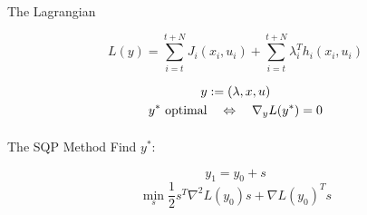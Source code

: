 

\begin{frame}{The Lagrangian}
\begin{block}{ }
\[  L(y) =   \sum\limits_{i=t}^{t+N} J_{i}(x_{i},u_{i})
  + \sum\limits_{i=t}^{t+N} \lambda_{i}^{T} h_i (x_i ,u_i ) \]
\end{block}
\begin{gather*}
	y := (\lambda,x,u) \\
	\vspace{1ex}
	y^* \text{ optimal} \quad \Leftrightarrow \quad \nabla_{y} L(y^*)  = 0
\end{gather*}

\end{frame}

%	
%	
%		
%		
%	

\begin{frame}{The SQP Method}
Find $y^*$:
\begin{block}{ }
\[ y_{1} = y_{0} + s \]
\[\min_{s}  \frac{1}{2} s^T \nabla^2 L(y_0) s + \nabla L(y_0)^T s \]
\end{block}
\hfill
\centering


\end{frame}

